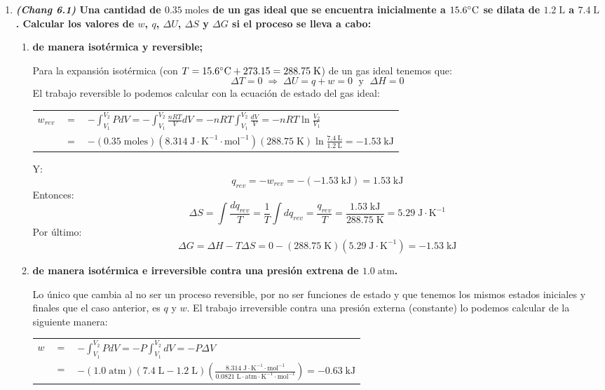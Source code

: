 \documentclass[a4paper,12pt]{article}
\begin{document}
\begin{enumerate}
Con lo que se ve que a $75.0\celsius$ la vaporizaci\'on no es espont\'anea, a $80.09\celsius$ est\'a en equilibrio y a $85.0\celsius$ la vaporizaci\'on es espont\'anea.

 \item \textbf{\textit{(Chang 6.1)} Una cantidad de $0.35\;\mbox{moles}$ de un gas ideal que se encuentra inicialmente a $15.6\celsius$ se dilata de $1.2\;\mbox{L}$ a $7.4\;\mbox{L}$. Calcular los valores de $w$, $q$, $\Delta U$, $\Delta S$ y $\Delta G$ si el proceso se lleva a cabo:}
 \begin{enumerate}
  \item \textbf{de manera isot\'ermica y reversible;}

Para la expansi\'on isot\'ermica (con $T=15.6\celsius+273.15=288.75\;\mbox{K}$) de un gas ideal tenemos que: 
$$\Delta T=0\;\Rightarrow\;\Delta U=q+w=0\;\mbox{ y }\;\Delta H=0$$
El trabajo reversible lo podemos calcular con la ecuaci\'on de estado del gas ideal:

\begin{tabular}{r c l}
$w_{rev}$ & $=$ & $-\int_{V_1}^{V_2}PdV=-\int_{V_1}^{V_2}\frac{nRT}{V}dV=-nRT\int_{V_1}^{V_2}\frac{dV}{V}=-nRT\ln\frac{V_2}{V_1}$ \\
& $=$ & $-(0.35\;\mbox{moles})(8.314\;\mbox{J}\cdot\mbox{K}^{-1}\cdot\mbox{mol}^{-1})(288.75\;\mbox{K})\ln\frac{7.4\;\mbox{L}}{1.2\;\mbox{L}}=-1.53\;\mbox{kJ}$
\end{tabular}

Y:
$$q_{rev}=-w_{rev}=-(-1.53\;\mbox{kJ})=1.53\;\mbox{kJ}$$
Entonces:
$$\Delta S=\int\frac{dq_{rev}}{T}=\frac{1}{T}\int dq_{rev}=\frac{q_{rev}}{T}=\frac{1.53\;\mbox{kJ}}{288.75\;\mbox{K}}=5.29\;\mbox{J}\cdot\mbox{K}^{-1}$$
Por \'ultimo:
$$\Delta G=\Delta H-T\Delta S=0-(288.75\;\mbox{K})(5.29\;\mbox{J}\cdot\mbox{K}^{-1})=-1.53\;\mbox{kJ}$$

  \item \textbf{de manera isot\'ermica e irreversible contra una presi\'on extrena de $1.0\;\mbox{atm}$.}

Lo \'unico que cambia al no ser un proceso reversible, por no ser funciones de estado y que tenemos los mismos estados iniciales y finales que el caso anterior, es $q$ y $w$. El trabajo irreversible contra una presi\'on externa (constante) lo podemos calcular de la siguiente manera:

\begin{tabular}{r c l}
$w$ & $=$ & $-\int_{V_1}^{V_2}PdV=-P\int_{V_1}^{V_2}dV=-P\Delta V$ \\
& $=$ & $-(1.0\;\mbox{atm})(7.4\;\mbox{L}-1.2\;\mbox{L})\left(\frac{8.314\;\mbox{J}\cdot\mbox{K}^{-1}\cdot\mbox{mol}^{-1}}{0.0821\;\mbox{L}\cdot\mbox{atm}\cdot\mbox{K}^{-1}\cdot\mbox{mol}^{-1}}\right)=-0.63\;\mbox{kJ}$
\end{tabular}


\end{enumerate}
\end{enumerate}
\end{document}
